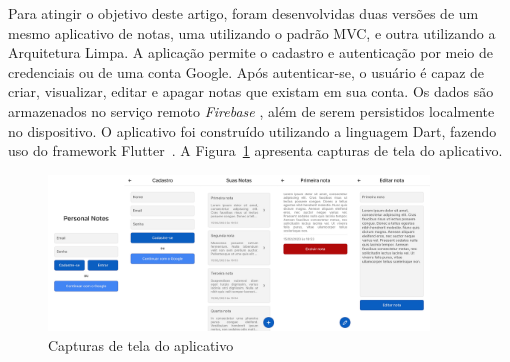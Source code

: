 Para atingir o objetivo deste artigo, foram desenvolvidas duas versões de um mesmo aplicativo de notas, uma utilizando o padrão MVC, e outra utilizando a Arquitetura Limpa.
A aplicação permite o cadastro e autenticação por meio de credenciais ou de uma conta Google.
Após autenticar-se, o usuário é capaz de criar, visualizar, editar e apagar notas que existam em sua conta.
Os dados são armazenados no serviço remoto \emph{Firebase} \cite{firebase}, além de serem persistidos localmente no dispositivo.
O aplicativo foi construído utilizando a linguagem Dart, fazendo uso do framework Flutter~\cite{flutter}.
A Figura~\ref{fig:screenshots} apresenta capturas de tela do aplicativo.

\begin{figure}[ht]
	\centering
	\includegraphics[width=0.9\textwidth]{images/screenshots.png}
	\caption{Capturas de tela do aplicativo}
	\label{fig:screenshots}
\end{figure}